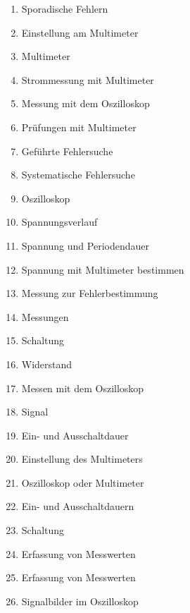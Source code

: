 \begin{enumerate}
\item
  Sporadische Fehlern\\
\item
  Einstellung am Multimeter\\
\item
  Multimeter\\
\item
  Strommessung mit Multimeter\\
\item
  Messung mit dem Oszilloskop\\
\item
  Prüfungen mit Multimeter\\
\item
  Geführte Fehlersuche\\
\item
  Systematische Fehlersuche\\
\item
  Oszilloskop\\
\item
  Spannungsverlauf\\
\item
  Spannung und Periodendauer\\
\item
  Spannung mit Multimeter bestimmen\\
\item
  Messung zur Fehlerbestimmung\\
\item
  Messungen\\
\item
  Schaltung\\
\item
  Widerstand\\
\item
  Messen mit dem Oszilloskop\\
\item
  Signal\\
\item
  Ein- und Ausschaltdauer\\
\item
  Einstellung des Multimeters\\
\item
  Oszilloskop oder Multimeter\\
\item
  Ein- und Ausschaltdauern\\
\item
  Schaltung\\
\item
  Erfassung von Messwerten\\
\item
  Erfassung von Messwerten\\
\item
  Signalbilder im Oszilloskop
\end{enumerate}

